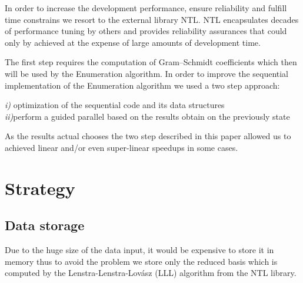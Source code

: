 \documentclass[conference]{IEEEtran}
\begin{document}
    In order to increase the development performance, ensure reliability and fulfill time constrains we resort to the external library NTL. NTL encapsulates decades of performance tuning by others and provides reliability assurances that could only by achieved at the expense of large amounts of development time.
    
    The first step requires the computation of Gram–Schmidt coefficients which then will be used by the Enumeration algorithm. In order to improve the sequential implementation of the Enumeration algorithm we used a two step approach:    
    
    \emph{i)} optimization of the sequential code and its data structures\\
    \indent \emph{ii)}perform a guided parallel based on the results obtain on the previously state
    
    
    As the results actual chooses the two step described in this paper allowed us to achieved linear and/or even super-linear speedups in some cases.
  
 
\section{Strategy}
 
 
 
\subsection{Data storage}
    
    Due to the huge size of the data input, it would be expensive to store it in memory thus to avoid the problem we store only the reduced basis which is computed by the Lenstra-Lenstra-Lovász (LLL) algorithm from the NTL library.
    
\end{document}
